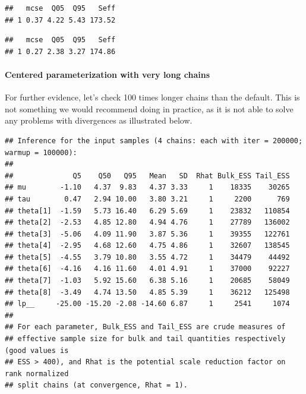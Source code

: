 \documentclass[american,]{article}
\let\oldparagraph\paragraph
\renewcommand{\paragraph}[1]{\oldparagraph{#1}\mbox{}}
\begin{document}
\begin{verbatim}
##   mcse  Q05  Q95   Seff
## 1 0.37 4.22 5.43 173.52
\end{verbatim}

\begin{verbatim}
##   mcse  Q05  Q95   Seff
## 1 0.27 2.38 3.27 174.86
\end{verbatim}

\hypertarget{centered-parameterization-with-very-long-chains}{%
\paragraph{Centered parameterization with very long
chains}\label{centered-parameterization-with-very-long-chains}}

For further evidence, let's check 100 times longer chains than the
default. This is not something we would recommend doing in practice, as
it is not able to solve any problems with divergences as illustrated
below.

\begin{verbatim}
## Inference for the input samples (4 chains: each with iter = 200000; warmup = 100000):
## 
##              Q5    Q50   Q95   Mean   SD  Rhat Bulk_ESS Tail_ESS
## mu        -1.10   4.37  9.83   4.37 3.33     1    18335    30265
## tau        0.47   2.94 10.00   3.80 3.21     1     2200      769
## theta[1]  -1.59   5.73 16.40   6.29 5.69     1    23832   110854
## theta[2]  -2.53   4.85 12.80   4.94 4.76     1    27789   136002
## theta[3]  -5.06   4.09 11.90   3.87 5.36     1    39355   122761
## theta[4]  -2.95   4.68 12.60   4.75 4.86     1    32607   138545
## theta[5]  -4.55   3.79 10.80   3.55 4.72     1    34479    44492
## theta[6]  -4.16   4.16 11.60   4.01 4.91     1    37000    92227
## theta[7]  -1.03   5.92 15.60   6.38 5.16     1    20685    58049
## theta[8]  -3.49   4.74 13.50   4.85 5.39     1    36212   125498
## lp__     -25.00 -15.20 -2.08 -14.60 6.87     1     2541     1074
## 
## For each parameter, Bulk_ESS and Tail_ESS are crude measures of 
## effective sample size for bulk and tail quantities respectively (good values is 
## ESS > 400), and Rhat is the potential scale reduction factor on rank normalized
## split chains (at convergence, Rhat = 1).
\end{verbatim}
\end{document}
